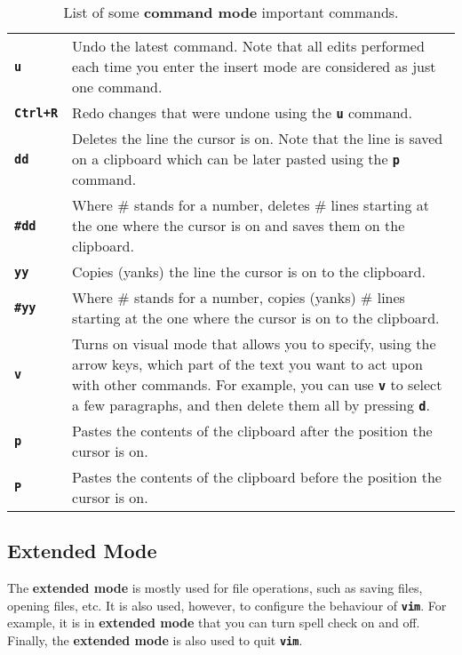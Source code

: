 \begin{table}[!htbp]
   \myfloatalign
   \begin{tabularx}{\textwidth}{Xp{95mm}} \toprule
     \textbf{\texttt{u}} & Undo the latest command. Note that all edits performed each time you enter the insert mode are considered as just one command.\\
     \textbf{\texttt{Ctrl+R}} & Redo changes that were undone using the \textbf{\texttt{u}} command. \\
     \textbf{\texttt{dd}} & Deletes the line the cursor is on. Note that the line is saved on a clipboard which can be later pasted using the \textbf{\texttt{p}} command. \\
      \textbf{\texttt{\#dd}} & Where \# stands for a number, deletes \# lines starting at the one where the cursor is on and saves them on the clipboard. \\
      \textbf{\texttt{yy}} & Copies (yanks) the line the cursor is on to the clipboard. \\
      \textbf{\texttt{\#yy}} & Where \# stands for a number, copies (yanks) \# lines starting at the one where the cursor is on to the clipboard.\\
      \textbf{\texttt{v}} & Turns on visual mode that allows you to specify, using the arrow keys, which part of the text you want to act upon with other commands. For example, you can use \textbf{\texttt{v}} to select a few paragraphs, and then delete them all by pressing \textbf{\texttt{d}}.\\
      \textbf{\texttt{p}} & Pastes the contents of the clipboard after the position the cursor is on.\\
      \textbf{\texttt{P}} & Pastes the contents of the clipboard before the position the cursor is on.\\
   \bottomrule
   \end{tabularx}
\caption{List of some \textbf{command mode} important commands.}
\label{tab:ch5_vim_commands}
\end{table}


\subsection*{Extended Mode}

The \textbf{extended mode} is mostly used for file operations, such as saving files, opening files, etc. It is also used, however, to configure the behaviour of \textbf{\texttt{vim}}. For example, it is in \textbf{extended mode} that you can turn spell check on and off. Finally, the \textbf{extended mode} is also used to quit \textbf{\texttt{vim}}.

